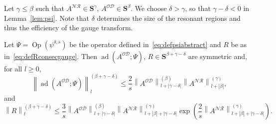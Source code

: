 \documentclass[AHL,Unicode,longabstracts,published]{cedram}
\DeclareMathOperator{\ad}{ad}
\DeclareMathOperator{\Op}{Op}
\newcommand{\CD}{\mathcal{D}}
\newcommand{\CN}{\mathcal{N}}
\newcommand{\CO}{\mathcal{O}}
\newcommand{\CR}{\mathcal{R}}
\newcommand{\COD}{{\CO\CD}}
\newcommand{\CNR}{{\CN\!\CR}}
\newcommand{\BS}{\mathbf S}
\newcommand{\resc}{s}
\newcommand{\abs}[1]{\left\lvert #1 \right\rvert}
\newcommand{\snorm}[3]{\left\| #1\right\|_{#3}^{(#2)}}
\begin{document}
Let $\gamma\leq\beta$ such that $A^{\CNR}\in\BS^\gamma$, $A^{\COD}\in\BS^\beta$. We choose $\delta >\gamma$, so that $\gamma -\delta< 0$ in Lemma~\ref{lem:psi}. Note that $\delta$ determines the size of the resonant regions and thus the efficiency of the gauge transform.
\begin{lemm}\label{lem:onestepweakgauge}
Let $\Psi=\Op(\psi^{\delta, s})$ be the operator defined in~\eqref{eq:defpsiabstract} and $R$ be as in~\eqref{eq:defRconsecgauge}. Then $\ad(A^\COD;\Psi)$, $R\in \BS^{\beta+\gamma - \delta}$ are symmetric and, for all $l\geq 0$,
\begin{equation}\label{eq:comaodpsi}
\snorm{\ad\left(A^\COD;\Psi\right)}{\beta+\gamma-\delta}{l}\le \frac{2}{\resc} \snorm{A^\COD}{\beta}{l + \abs{\gamma - \delta}}\snorm{A^\CNR}{\gamma}{l + \abs{\beta}},
\end{equation}
and
\begin{equation}\label{eq:Rnormboundsweak}
\snorm{R}{\beta+\gamma-\delta}l \le \frac{3}{\resc} \snorm{A^\COD}{\beta}{l + \abs{\gamma - \delta}}\snorm{A^\CNR}{\gamma}{l + \abs\beta+\abs{\gamma - \delta}}
\exp\left(\frac 2 \resc \snorm{A^\CNR}{\gamma}{l + \abs\beta+\abs{\gamma - \delta}}\right).
\end{equation}
\end{lemm}
\end{document}
